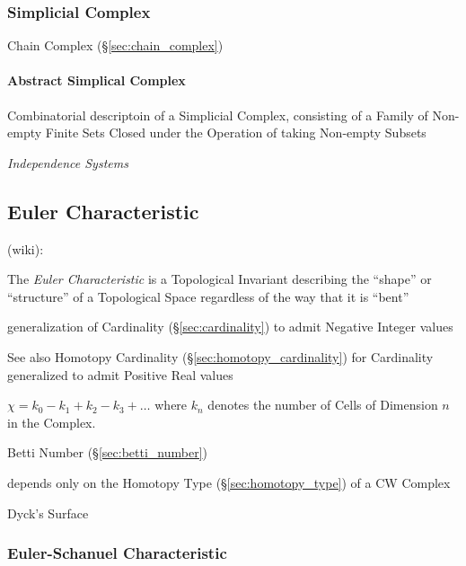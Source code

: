 \subsubsection{Simplicial Complex}\label{sec:simplicial_complex}

Chain Complex (\S\ref{sec:chain_complex})



\paragraph{Abstract Simplical Complex}\label{sec:abstract_complex}\hfill

Combinatorial descriptoin of a Simplicial Complex, consisting of a Family of
Non-empty Finite Sets Closed under the Operation of taking Non-empty Subsets

\emph{Independence Systems}



\subsection{Euler Characteristic}\label{sec:euler_characteristic}

(wiki):

The \emph{Euler Characteristic} is a Topological Invariant describing the
``shape'' or ``structure'' of a Topological Space regardless of the way that it
is ``bent''

generalization of Cardinality (\S\ref{sec:cardinality}) to admit
Negative Integer values

\fist See also Homotopy Cardinality (\S\ref{sec:homotopy_cardinality})
for Cardinality generalized to admit Positive Real values

$\chi = k_0 - k_1 + k_2 - k_3 + \ldots$ where $k_n$ denotes the number
of Cells of Dimension $n$ in the Complex.

Betti Number (\S\ref{sec:betti_number})

depends only on the Homotopy Type (\S\ref{sec:homotopy_type}) of a
CW Complex \cite{hatcher02}

Dyck's Surface



\subsubsection{Euler-Schanuel Characteristic}\label{sec:euler_schanuel}

